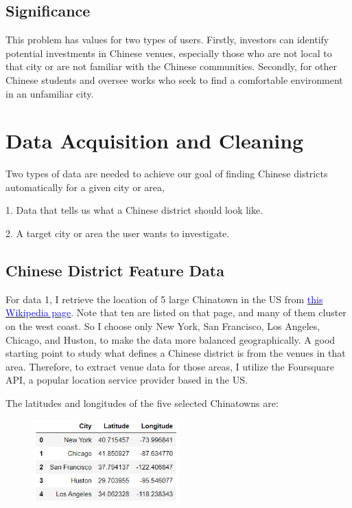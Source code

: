 \documentclass{article}
\begin{document}
\subsection{Significance}
This problem has values for two types of users. Firstly, investors can identify potential investments in Chinese venues, especially those who are not local to that city or are not familiar with the Chinese communities. Secondly, for other Chinese students and oversee works who seek to find a comfortable environment in an unfamiliar city.

\section{Data Acquisition and Cleaning}
Two types of data are needed to achieve our goal of finding Chinese districts automatically for a given city or area,

1. Data that tells us what a Chinese district should look like.

2. A target city or area the user wants to investigate.

\subsection{Chinese District Feature Data}

For data 1, I retrieve the location of 5 large Chinatown in the US from \href{https://en.wikipedia.org/wiki/Chinatowns_in_the_United_States}{\textcolor{blue}{this Wikipedia page}}. 
Note that ten are listed on that page, and many of them cluster on the west coast. So I choose only New York, San Francisco, Los Angeles, Chicago, and Huston, to make the data more balanced geographically.
A good starting point to study what defines a Chinese district is from the venues in that area.
Therefore, to extract venue data for those areas, I utilize the Foursquare API, a popular location service provider based in the US.\cite{foursquare}

The latitudes and longitudes of the five selected Chinatowns are:
\begin{figure}[h]
\includegraphics[width=0.5\textwidth]{c1.jpg}
\centering
\end{figure}
\end{document}
